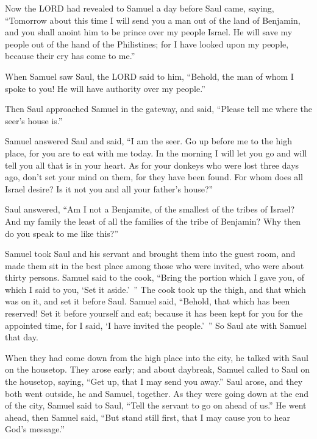 \myverse{}Now the LORD had revealed to Samuel a day before Saul came, saying,
\myverse{}“Tomorrow about this time I will send you a man out of the land of Benjamin,
and you shall anoint him to be prince over my people Israel. He will save my people out of the hand of
the Philistines; for I have looked upon my people, because their cry has come to me.”

\myverse{}When Samuel saw Saul, the LORD said to him, “Behold, the man
of whom I spoke to you! He will have authority over my people.”

\myverse{}Then Saul approached Samuel in the gateway, and said, “Please
tell me where the seer’s house is.”

\myverse{}Samuel answered Saul and said, “I am the seer. Go up before me
to the high place, for you are to eat with me today. In the morning I will let you go and will tell you
all that is in your heart.
\myverse{}As for your donkeys who were lost three days ago, don’t set your mind on them,
for they have been found. For whom does all Israel desire? Is it not you and all your father’s house?”

\myverse{}Saul answered, “Am I not a Benjamite, of the smallest of the
tribes of Israel? And my family the least of all the families of the tribe of Benjamin? Why then do you
speak to me like this?”

\myverse{}Samuel took Saul and his servant and brought them into the guest
room, and made them sit in the best place among those who were invited, who were about thirty persons.
\myverse{}Samuel said to the cook, “Bring the portion which I gave you, of which I said
to you, ‘Set it aside.’ ”
\myverse{}The cook took up the thigh, and that which was on it, and set it before Saul.
Samuel said, “Behold, that which has been reserved! Set it before yourself and eat; because it has been
kept for you for the appointed time, for I said, ‘I have invited the people.’ ” So Saul ate with Samuel
that day.

\myverse{}When they had come down from the high place into the city, he
talked with Saul on the housetop.
\myverse{}They arose early; and about daybreak, Samuel called to Saul on the housetop,
saying, “Get up, that I may send you away.” Saul arose, and they both went outside, he and Samuel, together.
\myverse{}As they were going down at the end of the city, Samuel said to Saul, “Tell
the servant to go on ahead of us.” He went ahead, then Samuel said, “But stand still first, that I may
cause you to hear God’s message.”



